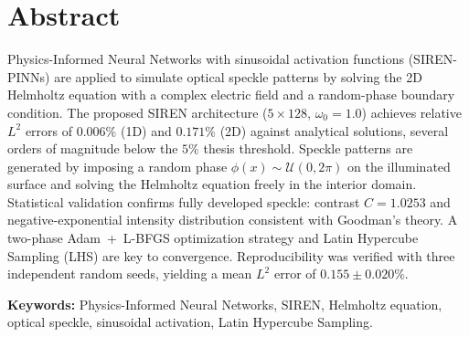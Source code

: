 
\chapter*{Abstract}

\vspace*{-8mm}

Physics-Informed Neural Networks with sinusoidal activation functions
(SIREN-PINNs) are applied to simulate optical speckle patterns by solving the
2D Helmholtz equation with a complex electric field and a random-phase boundary
condition. The proposed SIREN architecture ($5 \times 128$, $\omega_0 = 1.0$)
achieves relative $L^2$ errors of $0.006\%$ (1D) and $0.171\%$ (2D) against
analytical solutions, several orders of magnitude below the $5\%$ thesis
threshold.
Speckle patterns are generated by imposing a random phase
$\phi(x) \sim \mathcal{U}(0, 2\pi)$ on the illuminated surface and solving the
Helmholtz equation freely in the interior domain.
Statistical validation confirms fully developed speckle: contrast
$C = 1.0253$ and negative-exponential intensity distribution consistent with
Goodman's theory.
A two-phase Adam~+~L-BFGS optimization strategy and Latin Hypercube Sampling
(LHS) are key to convergence.
Reproducibility was verified with three independent random seeds, yielding a
mean $L^2$ error of $0.155 \pm 0.020\%$.

\bigskip

\noindent\textbf{Keywords:} Physics-Informed Neural Networks, SIREN,
Helmholtz equation, optical speckle, sinusoidal activation, Latin Hypercube
Sampling.
